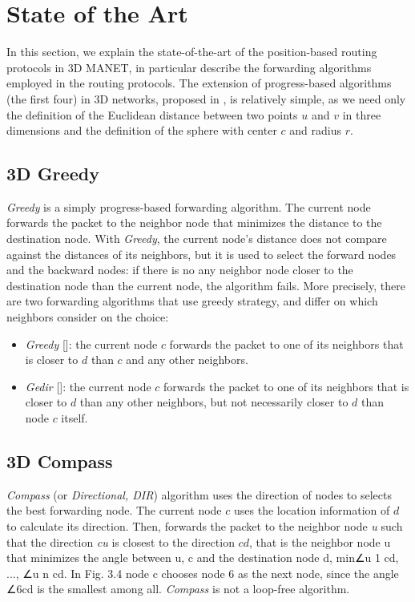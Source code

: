 \documentclass[journal,comsoc]{IEEEtran}
\begin{document}
\section{State of the Art}
In this section, we explain the state-of-the-art of the position-based routing protocols in 3D MANET, in particular describe the forwarding algorithms employed in the routing protocols. The extension of progress-based algorithms (the first four) in 3D networks, proposed in \cite{kao:3d}, is relatively simple, as we need only the definition of the Euclidean distance between two points \(u\) and \(v\) in three dimensions and the definition of the sphere with center \(c\) and radius \(r\).

\subsection{3D Greedy}
\emph{Greedy} is a simply progress-based forwarding algorithm. The current node forwards the packet to the neighbor node that minimizes the distance to the destination node. With \emph{Greedy}, the current node's distance does not compare against the distances of its neighbors, but it is used to select the forward nodes and the backward nodes: if there is no any neighbor node closer to the destination node than the current node, the algorithm fails. More precisely, there are two forwarding algorithms that use greedy strategy, and differ
on which neighbors consider on the choice:
\begin{itemize}
\item \emph{Greedy} []: the current node \(c\) forwards the packet to one of its neighbors that is closer to \(d\) than \(c\) and any other neighbors.
\item \emph{Gedir} []: the current node \(c\) forwards the packet to one of its neighbors that is closer to \(d\) than any other neighbors, but not necessarily closer to \(d\) than node \(c\) itself.
\end{itemize}

\subsection{3D Compass}
\emph{Compass} (or \emph{Directional, DIR}) algorithm uses the direction of nodes to selects the best forwarding node. The current node \(c\) uses the location information of \(d\) to calculate its direction. Then, forwards the packet to the neighbor node \emph{u} such that the direction \emph{cu} is closest to the direction \(cd\), that is the neighbor node u that minimizes the angle between u, c and the destination node d, min{∠u 1 cd, ..., ∠u n cd}. In Fig. 3.4 node c chooses node 6 as the next node, since the angle ∠6cd is the smallest among all. \emph{Compass} is not a loop-free algorithm.
\end{document}

